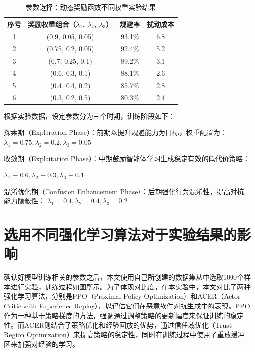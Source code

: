 \renewcommand{\arraystretch}{1.3}
\begin{table}[htbp]
	\centering
	\caption{参数选择：动态奖励函数不同权重实验结果}
	\label{tab:5.8}
	\begin{tabular*}{0.9\textwidth}{@{\extracolsep{\fill}}cccc}
		\toprule
		序号 & 奖励权重组合（$\lambda_1$, $\lambda_2$, $\lambda_3$） & 规避率 & 扰动成本 \\
		\midrule
		1 & (0.9, 0.05, 0.05) & 93.1\% & 6.8 \\
		2 & (0.75, 0.2, 0.05) & 92.4\% & 5.2 \\
		3 & (0.7, 0.25, 0.1) & 89.2\% & 3.1 \\
		4 & (0.6, 0.3, 0.1) & 88.1\% & 2.6 \\
		5 & (0.4, 0.4, 0.2) & 85.7\% & 2.8 \\
		6 & (0.3, 0.2, 0.5) & 80.3\% & 2.4 \\
		\bottomrule
	\end{tabular*}
\end{table}

根据实验数据，设定参数分为三个时期，训练阶段如下：


探索期（Exploration Phase）：前期以提升规避能力为目标，权重配置为：$\lambda_1= 0.75, \lambda_2 = 0.2, \lambda_3=0.05$


收敛期（Exploitation Phase）：中期鼓励智能体学习生成稳定有效的低代价策略：

$\lambda_1= 0.6, \lambda_2 = 0.3, \lambda_3=0.1$

混淆优化期（Confusion Enhancement Phase）：后期强化行为混淆性，提高对抗能力隐蔽性：
$\lambda_1= 0.4, \lambda_2 = 0.4, \lambda_3=0.2$

\section{选用不同强化学习算法对于实验结果的影响}

确认好模型训练相关的参数之后，本文使用自己所创建的数据集从中选取1000个样本进行实验，训练过程如图所示。为了体现对比度，在本实验中，本文对比了两种强化学习算法，分别是PPO（Proximal Policy Optimization）和ACER\cite{wang2016sample}（Actor-Critic with Experience Replay），以评估它们在恶意软件对抗生成中的表现。PPO作为一种基于策略梯度的方法，强调通过调整策略的更新幅度来保证训练的稳定性。而ACER则结合了策略优化和经验回放的优势，通过信任域优化（Trust Region Optimization）来提高策略的稳定性，同时在训练过程中使用了重放缓冲区来加强对经验的学习。

